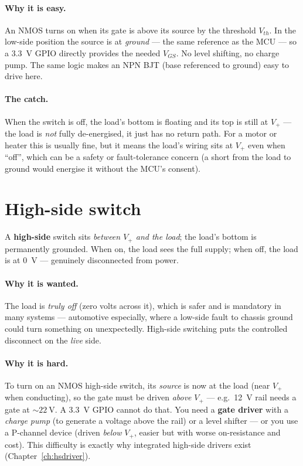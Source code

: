 \documentclass[11pt,a4paper,oneside]{book}
\begin{document}
\paragraph{Why it is easy.} An NMOS turns on when its gate is above its source by
the threshold $V_{th}$. In the low-side position the source is at \emph{ground} ---
the same reference as the MCU --- so a \qty{3.3}{\volt} GPIO directly provides
the needed $V_{GS}$. No level shifting, no charge pump. The same logic makes an
NPN BJT (base referenced to ground) easy to drive here.

\paragraph{The catch.} When the switch is off, the load's bottom is floating and
its top is still at $V_+$ --- the load is \emph{not} fully de-energised, it just
has no return path. For a motor or heater this is usually fine, but it means the
load's wiring sits at $V_+$ even when ``off'', which can be a safety or
fault-tolerance concern (a short from the load to ground would energise it
without the MCU's consent).

\section{High-side switch}
A \textbf{high-side} switch sits \emph{between $V_+$ and the load}; the load's
bottom is permanently grounded. When on, the load sees the full supply; when off,
the load is at \qty{0}{\volt} --- genuinely disconnected from power.

\paragraph{Why it is wanted.} The load is \emph{truly off} (zero volts across it),
which is safer and is mandatory in many systems --- automotive especially, where
a low-side fault to chassis ground could turn something on unexpectedly.
High-side switching puts the controlled disconnect on the \emph{live} side.

\paragraph{Why it is hard.} To turn on an NMOS high-side switch, its
\emph{source} is now at the load (near $V_+$ when conducting), so the gate must be
driven \emph{above} $V_+$ --- e.g.\ \qty{12}{\volt} rail needs a gate at
$\sim\qty{22}{\volt}$. A \qty{3.3}{\volt} GPIO cannot do that. You need a
\textbf{gate driver} with a \emph{charge pump} (to generate a voltage above the
rail) or a level shifter --- or you use a P-channel device (driven \emph{below}
$V_+$, easier but with worse on-resistance and cost). This difficulty is exactly
why integrated high-side drivers exist (Chapter~\ref{ch:hsdriver}).
\end{document}
